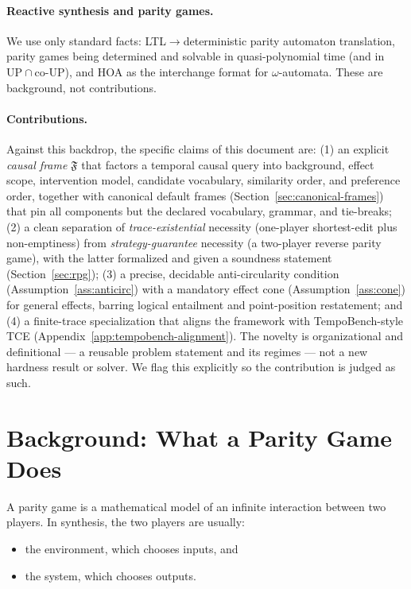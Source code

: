 \documentclass[11pt]{article}
\theoremstyle{remark}
\newcommand{\Frame}{\mathfrak{F}}
\begin{document}
\paragraph{Reactive synthesis and parity games.} We use only standard facts:
LTL${}\to{}$deterministic parity automaton translation, parity games being
determined and solvable in quasi-polynomial time (and in
$\mathrm{UP}\cap\mathrm{co\text{-}UP}$), and HOA as the interchange format for
$\omega$-automata. These are background, not contributions.

\paragraph{Contributions.} Against this backdrop, the specific claims of this
document are: (1) an explicit \emph{causal frame} $\Frame$ that factors a temporal
causal query into background, effect scope, intervention model, candidate
vocabulary, similarity order, and preference order, together with canonical
default frames (Section~\ref{sec:canonical-frames}) that pin all components but
the declared vocabulary, grammar, and tie-breaks; (2) a clean separation of \emph{trace-existential}
necessity (one-player shortest-edit plus non-emptiness) from \emph{strategy-guarantee}
necessity (a two-player reverse parity game), with the latter formalized and given
a soundness statement (Section~\ref{sec:rpg}); (3) a precise, decidable
anti-circularity condition (Assumption~\ref{ass:anticirc}) with a mandatory effect
cone (Assumption~\ref{ass:cone}) for general effects, barring logical entailment
and point-position restatement; and (4) a finite-trace
specialization that aligns the framework with TempoBench-style TCE
(Appendix~\ref{app:tempobench-alignment}). The novelty is organizational and
definitional --- a reusable problem statement and its regimes --- not a new
hardness result or solver. We flag this explicitly so the contribution is judged
as such.

\section{Background: What a Parity Game Does}
\label{sec:background-parity}

A parity game is a mathematical model of an infinite interaction between two
players. In synthesis, the two players are usually:
\begin{itemize}
  \item the environment, which chooses inputs, and
  \item the system, which chooses outputs.
\end{itemize}
\end{document}
